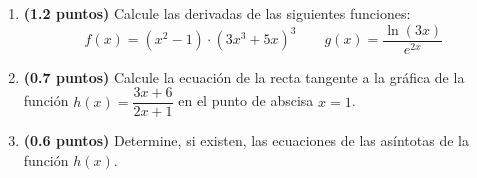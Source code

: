 
\begin{enumerate}[label=\alph*)]
\item \textbf{(1.2 puntos)} Calcule las derivadas de las siguientes funciones:
\[
f(x)=(x^2-1)\cdot(3x^3+5x)^3\qquad g(x)=\frac{\ln(3x)}{e^{2x}}
\]
\item \textbf{(0.7 puntos)} Calcule la ecuación de la recta tangente a la gráfica de la función $h(x)=\dfrac{3x+6}{2x+1}$ en el punto de abscisa $x=1$.
\item \textbf{(0.6 puntos)} Determine, si existen, las ecuaciones de las asíntotas de la función $h(x)$.
\end{enumerate}
